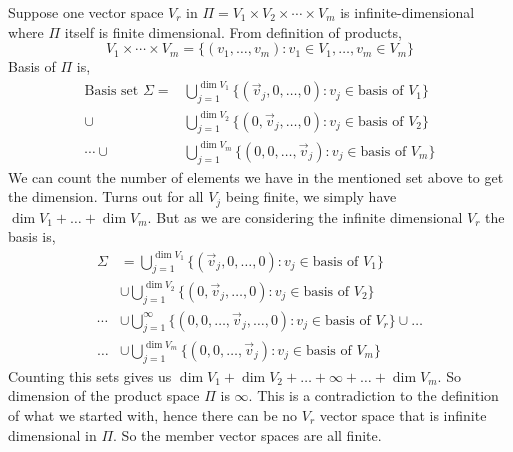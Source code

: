 \documentclass[letter]{article}
\begin{document}
Suppose one vector space $V_r$ in $\Pi = V_1 \times V_2 \times  \cdots \times V_m$ is infinite-dimensional where $\Pi$ itself is finite dimensional. From definition of products, 
\[
V_1 \times \cdots \times V_m = 
\{(v_1, \ldots, v_m) : v_1 \in V_1 , \ldots, v_m \in V_m\} 
\]
Basis of $\Pi$ is, 
\begin{align*}
\text{Basis set }  \Sigma =	&\bigcup_{j = 1}^{\dim  V_1} \{(\vec{v}_j, 0, \ldots, 0) : v_j \in \text{basis of }V_1\} \\ 
\cup  &
	\bigcup_{j = 1}^{\dim V_2} \{(0, \vec{v}_j, \ldots, 0) : v_j \in \text{basis of }V_2\}  
	 \\
\cdots  \cup &
	\bigcup_{j = 1}^{\dim V_m} \{(0, 0, \ldots, \vec{v}_j) : v_j \in \text{basis of }V_m\}  
\end{align*} 
We can count the number of elements we have in the mentioned set above to get the dimension. Turns out for all $V_j$ being finite, we simply have $\dim V_1 + \ldots + \dim V_m$. But as we are considering the infinite dimensional $V_r$ the basis is, 
\begin{align*}
	\Sigma &= \bigcup_{j = 1}^{\dim  V_1} \{(\vec{v}_j, 0, \ldots, 0) : v_j \in \text{basis of }V_1\} \\ 
	&\cup  
	\bigcup_{j = 1}^{\dim V_2} \{(0, \vec{v}_j, \ldots, 0) : v_j \in \text{basis of }V_2\}  
	 \\
	\cdots & \cup
	\bigcup_{j = 1}^{\infty} \{(0, 0, \ldots, \vec{v}_j, \ldots, 0) : v_j \in \text{basis of }V_r\}  \cup \ldots \\
	 \ldots 
	       & \cup \bigcup_{j = 1}^{\dim V_m} \{(0, 0, \ldots, \vec{v}_j) : v_j \in \text{basis of }V_m\}  
\end{align*} 
Counting this sets gives us $\dim V_1 + \dim V_2 + \ldots + \infty + \ldots + \dim V_m$. So dimension of the product space $\Pi$ is $\infty$. This is a contradiction to the definition of what we started with, hence there can be no $V_r$ vector space that is infinite dimensional in $\Pi$. So the member vector spaces are all finite. 
\end{document}
